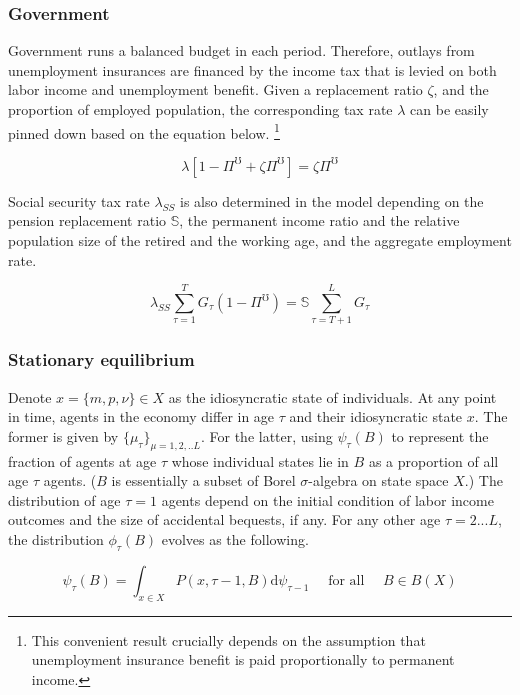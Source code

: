 \subsubsection{Government}

Government runs a balanced budget in each period. Therefore, outlays from unemployment insurances are financed by the income tax that is levied on both labor income and unemployment benefit. Given a replacement ratio $\zeta$, and the proportion of employed population, the corresponding tax rate $\lambda$ can be easily pinned down based on the equation below. \footnote{This convenient result crucially depends on the assumption that unemployment insurance benefit is paid proportionally to permanent income.} 

\begin{equation}
\label{Eq:gov}
    \lambda \left[ 1-\Pi^\mho  + \zeta \Pi^\mho \right]  = \zeta \Pi^\mho   
\end{equation}

Social security tax rate $\lambda_{SS}$ is also determined in the model depending on the pension replacement ratio $\mathbb{S}$, the permanent income ratio and the relative population size of the retired and the working age, and the aggregate employment rate. 

\begin{equation}
\label{Eq:gov2}
    \lambda_{SS} \sum^{T}_{\tau=1}G_{\tau}(1-\Pi^\mho) = \mathbb{S} \sum^{L}_{\tau=T+1} G_{\tau} 
\end{equation}


\subsubsection{Stationary equilibrium}

Denote $x= \{m,p,\nu \} \in X$  as the idiosyncratic state of individuals. At any point in time, agents in the economy differ in age $\tau$ and their idiosyncratic state $x$. The former is given by $\{\mu_\tau \}_{\mu=1,2,..L}$. For the latter, using $\psi_\tau(B)$ to represent the fraction of agents at age $\tau$ whose individual states lie in $B$ as a proportion of all age $\tau$ agents. ($B$ is essentially a subset of Borel $\sigma$-algebra on state space $X$.) The distribution of age $\tau=1$ agents depend on the initial condition of labor income outcomes and the size of accidental bequests, if any. For any other age $\tau=2...L$, the distribution $\phi_\tau(B)$ evolves as the following.

\begin{equation}
\label{Eq:DistDyn}
\psi_{\tau}(B)=\int_{x \in X} P(x, \tau-1, B) \mathrm{d} \psi_{\tau-1} \quad \text { for all } \quad B \in B(X)
\end{equation}

